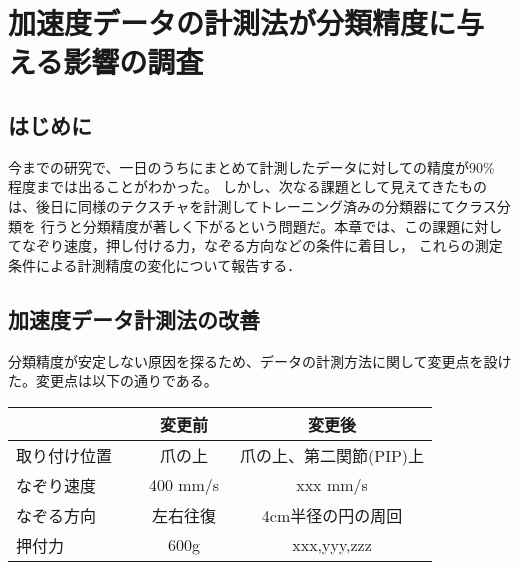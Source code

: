﻿\chapter{加速度データの計測法が分類精度に与える影響の調査}
\section{はじめに} 
今までの研究で、一日のうちにまとめて計測したデータに対しての精度が90\% 程度までは出ることがわかった。
しかし、次なる課題として見えてきたものは、後日に同様のテクスチャを計測してトレーニング済みの分類器にてクラス分類を
行うと分類精度が著しく下がるという問題だ。本章では、この課題に対してなぞり速度，押し付ける力，なぞる方向などの条件に着目し，
これらの測定条件による計測精度の変化について報告する．

\section{加速度データ計測法の改善}
分類精度が安定しない原因を探るため、データの計測方法に関して変更点を設けた。変更点は以下の通りである。
\begin{table}[htb]
	\begin{tabular}{l||c|c}\hline
	　　　　  & 変更前　　& 変更後\\ \hline \hline
取り付け位置　&爪の上    & 爪の上、第二関節(PIP)上 \\ \hline
なぞり速度　　& 400 mm/s   & xxx mm/s\\ \hline
なぞる方向  　&左右往復　&4cm半径の円の周回\\ \hline
押付力      　&600g      &xxx,yyy,zzz \\ \hline
	\end{tabular}
\end{table}
